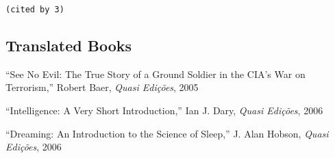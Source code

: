 \documentclass[11pt, a4paper]{article}
\newcommand{\years}[1]{\marginnote{\scriptsize #1}}
\begin{document}
\noindent\years{2013\emph{b}} \texttt{(cited by 3)}

\subsection*{Translated Books}

\noindent\years{2005} ``See No Evil: The True Story of a Ground Soldier
in the CIA's War on Terrorism,'' Robert Baer, \emph{Quasi Edições}, 2005

\noindent\years{2006\emph{a}} ``Intelligence: A Very Short Introduction,'' Ian
J. Dary, \emph{Quasi Edições}, 2006

\noindent\years{2006\emph{b}} ``Dreaming: An Introduction to the Science of
Sleep,'' J. Alan Hobson, \emph{Quasi Edições}, 2006
\end{document}

